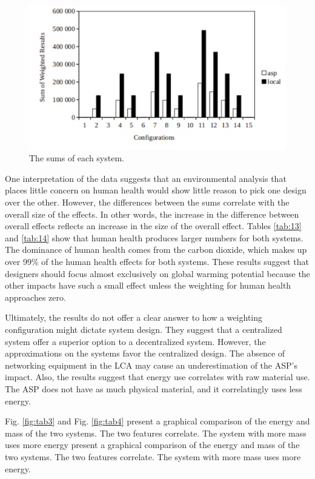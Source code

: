 \documentclass[final,journal,10pt,letterpaper,oneside,twocolumn,compsoc]%
{IEEEtran}
\begin{document}
\begin{figure}[t!]
  \centering
    \includegraphics[scale=0.55]{sums}
  \caption{The sums of each system.}
  \label{fig:tab2}
\end{figure}

One interpretation of the data suggests that an environmental analysis that
places little concern on human health would show little reason to
pick one design over the other. However, the differences between the sums
correlate with the
overall size of the effects. In other words, the increase in the difference
between overall effects
reflects an increase in the size of the overall effect. Tables \ref{tab:13}
and \ref{tab:14} show
that human health produces larger numbers for both systems. The dominance of
human health comes from the carbon dioxide, which makes up over 99\% of the
human health effects for both systems. These results suggest that
designers should focus almost exclusively on global warming potential because
the other impacts have such a small effect unless the weighting for human
health approaches zero.

Ultimately, the results do not offer a clear answer to how a weighting
configuration might
dictate system design. They suggest that a centralized system offer
a superior option to a decentralized system. However, the approximations on the
systems favor the centralized design. The absence of networking equipment in the
LCA may cause an underestimation of the ASP's impact. Also, the results suggest
that energy use correlates with raw material use. The ASP does not have as much
physical material, and it correlatingly uses less energy.

Fig. \ref{fig:tab3} and Fig. \ref{fig:tab4} present a graphical comparison of the
energy and mass of the two systems. The two features correlate. The system with
more mass uses more energy present a graphical comparison of the energy and mass
of the two systems. The two features correlate. The system with more mass uses
more energy.
\end{document}
